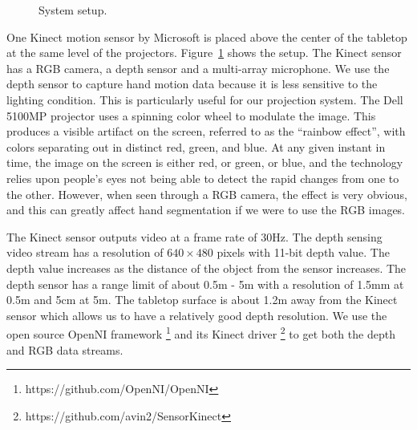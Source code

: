 \begin{figure}
  \centering
  \caption{System setup.} \label{fig:setup}
\end{figure}

One Kinect motion sensor by Microsoft is placed above the center of the tabletop
at the same level of the projectors. Figure~\ref{fig:setup} shows the setup. The
Kinect sensor has a RGB camera, a depth sensor and a multi-array microphone.
We use the depth sensor to capture hand motion data because it is
less sensitive to the lighting condition. This is particularly useful for our
projection system. The Dell 5100MP projector uses a spinning color wheel to
modulate the image. This produces a visible artifact on the screen, referred to 
as the ``rainbow effect'', with colors separating out in distinct red, green, 
and blue. At any given instant in time, the image on the screen is either red, or green, or blue,
and the technology relies upon people's eyes not being able to detect the rapid 
changes from one to the other. However, when seen through a RGB camera, the
effect is very obvious, and this can greatly affect hand segmentation if we were to use 
the RGB images. 

The Kinect sensor outputs video at a frame rate of 30Hz. The depth sensing video
stream has a resolution of $640\times 480$ pixels with 11-bit depth value. The
depth value increases as the distance of the object from the sensor increases.
The depth sensor has a range limit of about 0.5m - 5m with a resolution of 1.5mm
at 0.5m and 5cm at 5m. The tabletop surface is about 1.2m away from the Kinect
sensor which allows us to have a relatively good depth resolution. We use the
open source OpenNI framework \footnote{https://github.com/OpenNI/OpenNI} and its
Kinect driver \footnote{https://github.com/avin2/SensorKinect} to get both the depth and RGB data streams.

